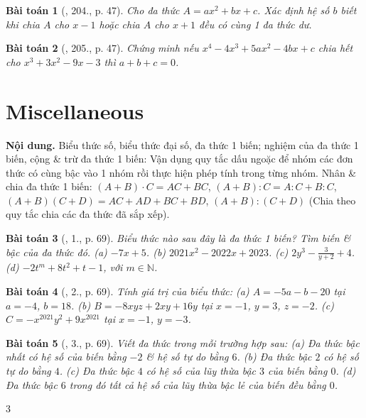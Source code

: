 \documentclass{article}
\newtheorem{baitoan}{Bài toán}
\begin{document}
\begin{baitoan}[\cite{Tuyen_Toan_7}, 204., p. 47]
	Cho đa thức $A = ax^2 + bx + c$. Xác định hệ số $b$ biết khi chia $A$ cho $x - 1$ hoặc chia $A$ cho $x + 1$ đều có cùng 1 đa thức dư.
\end{baitoan}

\begin{baitoan}[\cite{Tuyen_Toan_7}, 205., p. 47]
	Chứng minh nếu $x^4 - 4x^3 + 5ax^2 - 4bx + c$ chia hết cho $x^3 + 3x^2 - 9x - 3$ thì $a + b + c = 0$.
\end{baitoan}


\section{Miscellaneous}
\textsf{\textbf{Nội dung.} Biểu thức số, biểu thức đại số, đa thức 1 biến; nghiệm của đa thức 1 biến, cộng \& trừ đa thức 1 biến:} Vận dụng quy tắc dấu ngoặc để nhóm các đơn thức có cùng bậc vào 1 nhóm rồi thực hiện phép tính trong từng nhóm. \textsf{Nhân \& chia đa thức 1 biến:} $(A + B)\cdot C = AC + BC$, $(A + B):C = A:C + B:C$, $(A + B)(C + D) = AC + AD + BC + BD$, $(A + B):(C + D)$ (Chia theo quy tắc chia các đa thức đã sắp xếp).

\begin{baitoan}[\cite{SGK_Toan_7_Canh_Dieu_tap_2}, 1., p. 69]
	Biểu thức nào sau đây là đa thức 1 biến? Tìm biến \& bậc của đa thức đó. (a) $-7x + 5$. (b) $2021x^2 - 2022x + 2023$. (c) $2y^3 - \frac{3}{y + 2} + 4$. (d) $-2t^m + 8t^2 + t - 1$, với $m\in\mathbb{N}$.
\end{baitoan}

\begin{baitoan}[\cite{SGK_Toan_7_Canh_Dieu_tap_2}, 2., p. 69]
	Tính giá trị của biểu thức: (a) $A = -5a - b - 20$ tại $a = -4$, $b = 18$. (b) $B = -8xyz + 2xy + 16y$ tại $x = -1$, $y = 3$, $z = -2$. (c) $C = -x^{2021}y^2 + 9x^{2021}$ tại $x = -1$, $y = -3$.
\end{baitoan}

\begin{baitoan}[\cite{SGK_Toan_7_Canh_Dieu_tap_2}, 3., p. 69]
	Viết đa thức trong mỗi trường hợp sau: (a) Đa thức bậc nhất có hệ số của biến bằng $-2$ \& hệ số tự do bằng $6$. (b) Đa thức bậc $2$ có hệ số tự do bằng $4$. (c) Đa thức bậc $4$ có hệ số của lũy thừa bậc $3$ của biến bằng $0$. (d) Đa thức bậc $6$  trong đó tất cả hệ số của lũy thừa bậc lẻ của biến đều bằng $0$. 
\end{baitoan}3
\end{document}
